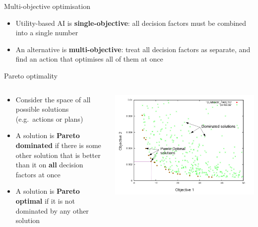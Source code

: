 \begin{frame}{Multi-objective optimisation}
    \begin{itemize}
        \pause\item Utility-based AI is \textbf{single-objective}:
            all decision factors must be combined into a single number
        \pause\item An alternative is \textbf{multi-objective}:
            treat all decision factors as separate, and find an action that optimises all of them at once
    \end{itemize}
\end{frame}

\begin{frame}{Pareto optimality}
    \begin{columns}
        \begin{column}{0.5\textwidth}
            \begin{itemize}
                \pause\item Consider the space of all possible solutions (e.g.\ actions or plans)
                \pause\item A solution is \textbf{Pareto dominated} if there is some other solution
                    that is better than it on \textbf{all} decision factors at once
                \pause\item A solution is \textbf{Pareto optimal} if it is not dominated by any other solution
            \end{itemize}
        \end{column}
        \begin{column}{0.45\textwidth}
            \includegraphics[width=\textwidth]{pareto}
        \end{column}
    \end{columns}
\end{frame}

